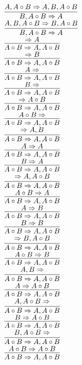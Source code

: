 \documentclass[11pt]{article}
\begin{document}
\begin{center}
\bigskip
\\$\infer{B, A\circ B\Rightarrow A}{A, A\circ B\Rightarrow A, B, A\circ B}$
\bigskip
\\$\infer{B, A\circ B\Rightarrow A}{A, B, A\circ B\Rightarrow B, A\circ B}$
\bigskip
\\$\infer{A\circ B\Rightarrow A, A\circ B}{\Rightarrow A}$
\bigskip
\\$\infer{A\circ B\Rightarrow A, A\circ B}{\Rightarrow B}$
\bigskip
\\$\infer{A\circ B\Rightarrow A, A\circ B}{A\Rightarrow }$
\bigskip
\\$\infer{A\circ B\Rightarrow A, A\circ B}{B\Rightarrow }$
\bigskip
\\$\infer{A\circ B\Rightarrow A, A\circ B}{\Rightarrow A\circ B}$
\bigskip
\\$\infer{A\circ B\Rightarrow A, A\circ B}{A\circ B\Rightarrow }$
\bigskip
\\$\infer{A\circ B\Rightarrow A, A\circ B}{\Rightarrow A, B}$
\bigskip
\\$\infer{A\circ B\Rightarrow A, A\circ B}{A\Rightarrow A}$
\bigskip
\\$\infer{A\circ B\Rightarrow A, A\circ B}{B\Rightarrow A}$
\bigskip
\\$\infer{A\circ B\Rightarrow A, A\circ B}{\Rightarrow A, A\circ B}$
\bigskip
\\$\infer{A\circ B\Rightarrow A, A\circ B}{A\circ B\Rightarrow A}$
\bigskip
\\$\infer{A\circ B\Rightarrow A, A\circ B}{A\Rightarrow B}$
\bigskip
\\$\infer{A\circ B\Rightarrow A, A\circ B}{B\Rightarrow B}$
\bigskip
\\$\infer{A\circ B\Rightarrow A, A\circ B}{\Rightarrow B, A\circ B}$
\bigskip
\\$\infer{A\circ B\Rightarrow A, A\circ B}{A\circ B\Rightarrow B}$
\bigskip
\\$\infer{A\circ B\Rightarrow A, A\circ B}{A, B\Rightarrow }$
\bigskip
\\$\infer{A\circ B\Rightarrow A, A\circ B}{A\Rightarrow A\circ B}$
\bigskip
\\$\infer{A\circ B\Rightarrow A, A\circ B}{A, A\circ B\Rightarrow }$
\bigskip
\\$\infer{A\circ B\Rightarrow A, A\circ B}{B\Rightarrow A\circ B}$
\bigskip
\\$\infer{A\circ B\Rightarrow A, A\circ B}{B, A\circ B\Rightarrow }$
\bigskip
\\$\infer{A\circ B\Rightarrow A, A\circ B}{A\circ B\Rightarrow A\circ B}$

\end{center}
\end{document}
